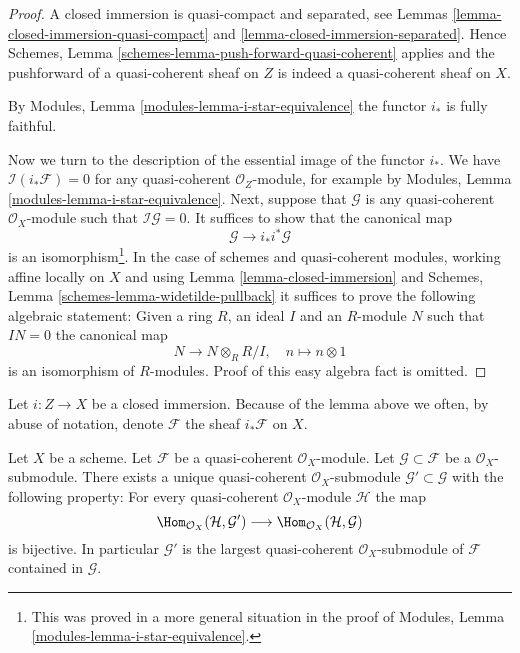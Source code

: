 \begin{proof}
A closed immersion is quasi-compact and separated, see
Lemmas \ref{lemma-closed-immersion-quasi-compact} and
\ref{lemma-closed-immersion-separated}. Hence
Schemes, Lemma \ref{schemes-lemma-push-forward-quasi-coherent}
applies and the pushforward of a quasi-coherent
sheaf on $Z$ is indeed a quasi-coherent sheaf on $X$.

\medskip\noindent
By Modules, Lemma \ref{modules-lemma-i-star-equivalence}
the functor $i_*$ is fully faithful.

\medskip\noindent
Now we turn to the description of the essential image of the
functor $i_*$. We have $\mathcal{I}(i_*\mathcal{F}) = 0$
for any quasi-coherent $\mathcal{O}_Z$-module, for example by
Modules, Lemma \ref{modules-lemma-i-star-equivalence}.
Next, suppose that $\mathcal{G}$
is any quasi-coherent $\mathcal{O}_X$-module such that
$\mathcal{I}\mathcal{G} = 0$. It suffices to show that the canonical map
$$
\mathcal{G} \longrightarrow i_* i^*\mathcal{G}
$$
is an isomorphism\footnote{This was proved in a more general situation
in the proof of  Modules, Lemma \ref{modules-lemma-i-star-equivalence}.}.
In the case of schemes and quasi-coherent modules, working affine locally
on $X$ and using Lemma \ref{lemma-closed-immersion} and
Schemes, Lemma \ref{schemes-lemma-widetilde-pullback}
it suffices to prove the following algebraic statement: Given a ring
$R$, an ideal $I$ and an $R$-module $N$ such that $IN = 0$ the canonical map
$$
N \longrightarrow N \otimes_R R/I,\quad
n \longmapsto n \otimes 1
$$
is an isomorphism of $R$-modules. Proof of this easy algebra fact is omitted.
\end{proof}

\noindent
Let $i : Z \to X$ be a closed immersion. Because of the lemma above we often,
by abuse of notation, denote $\mathcal{F}$ the sheaf $i_*\mathcal{F}$ on $X$.

\begin{lemma}
\label{lemma-largest-quasi-coherent-subsheaf}
Let $X$ be a scheme. Let $\mathcal{F}$ be a quasi-coherent
$\mathcal{O}_X$-module. Let $\mathcal{G} \subset \mathcal{F}$
be a $\mathcal{O}_X$-submodule. There exists a unique quasi-coherent
$\mathcal{O}_X$-submodule $\mathcal{G}' \subset \mathcal{G}$
with the following property: For every quasi-coherent $\mathcal{O}_X$-module
$\mathcal{H}$ the map
$$
\Hom_{\mathcal{O}_X}(\mathcal{H}, \mathcal{G}')
\longrightarrow
\Hom_{\mathcal{O}_X}(\mathcal{H}, \mathcal{G})
$$
is bijective. In particular $\mathcal{G}'$ is the largest quasi-coherent
$\mathcal{O}_X$-submodule of $\mathcal{F}$ contained in $\mathcal{G}$.
\end{lemma}

